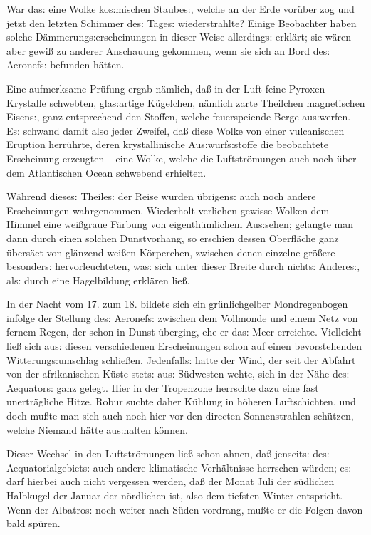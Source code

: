 \documentclass[oneside,12pt]{book}
\newcommand{\s}{s:}
\begin{document}
War da{\s} eine Wolke ko{\s}mischen Staube{\s}, welche an der Erde
vor\"uber zog und jetzt den letzten Schimmer de{\s} Tage{\s}
wiederstrahlte? Einige Beobachter haben solche
D\"ammerung{\s}erscheinungen in dieser Weise allerding{\s} erkl\"art;
sie w\"aren aber gewi{\ss} zu anderer Anschauung gekommen, wenn sie
sich an Bord de{\s} Aeronef{\s} befunden h\"atten.

Eine aufmerksame Pr\"ufung ergab n\"amlich, da{\ss} in der Luft feine
Pyroxen-Krystalle schwebten, gla{\s}artige K\"ugelchen, n\"amlich
zarte Theilchen magnetischen Eisen{\s}, ganz entsprechend den
Stoffen, welche feuerspeiende Berge au{\s}werfen. E{\s} schwand damit
also jeder Zweifel, da{\ss} diese Wolke von einer vulcanischen
Eruption herr\"uhrte, deren krystallinische Au{\s}wurf{\s}stoffe die
beobachtete Erscheinung erzeugten -- eine Wolke, welche die
Luftstr\"omungen auch noch \"uber dem Atlantischen Ocean schwebend
erhielten.

W\"ahrend diese{\s} Theile{\s} der Reise wurden \"ubrigen{\s} auch
noch andere Erscheinungen wahrgenommen. Wiederholt verliehen gewisse
Wolken dem Himmel eine wei{\ss}graue F\"arbung von eigenth\"umlichem
Au{\s}sehen; gelangte man dann durch einen solchen Dunstvorhang, so
erschien dessen Oberfl\"ache ganz \"ubers\"aet von gl\"anzend
wei{\ss}en K\"orperchen, zwischen denen einzelne gr\"o{\ss}ere
besonder{\s} hervorleuchteten, wa{\s} sich unter dieser Breite durch
nicht{\s} Andere{\s}, al{\s} durch eine Hagelbildung erkl\"aren
lie{\ss}.

In der Nacht vom 17. zum 18. bildete sich ein gr\"unlichgelber
Mondregenbogen infolge der Stellung de{\s} Aeronef{\s} zwischen dem
Vollmonde und einem Netz von fernem Regen, der schon in Dunst
\"uberging, ehe er da{\s} Meer erreichte. Vielleicht lie{\ss} sich
au{\s} diesen verschiedenen Erscheinungen schon auf einen
bevorstehenden Witterung{\s}umschlag schlie{\ss}en. Jedenfall{\s}
hatte der Wind, der seit der Abfahrt von der afrikanischen K\"uste
stet{\s} au{\s} S\"udwesten wehte, sich in der N\"ahe de{\s}
Aequator{\s} ganz gelegt. Hier in der Tropenzone herrschte dazu eine
fast unertr\"agliche Hitze. Robur suchte daher K\"uhlung in h\"oheren
Luftschichten, und doch mu{\ss}te man sich auch noch hier vor den
directen Sonnenstrahlen sch\"utzen, welche Niemand h\"atte
au{\s}halten k\"onnen.

Dieser Wechsel in den Luftstr\"omungen lie{\ss} schon ahnen, da{\ss}
jenseit{\s} de{\s} Aequatorialgebiet{\s} auch andere klimatische
Verh\"altnisse herrschen w\"urden; e{\s} darf hierbei auch nicht
vergessen werden, da{\ss} der Monat Juli der s\"udlichen Halbkugel
der Januar der n\"ordlichen ist, also dem tiefsten Winter entspricht.
Wenn der {\glqq}Albatro{\s}{\grqq} noch weiter nach S\"uden vordrang,
mu{\ss}te er die Folgen davon bald sp\"uren.
\end{document}
